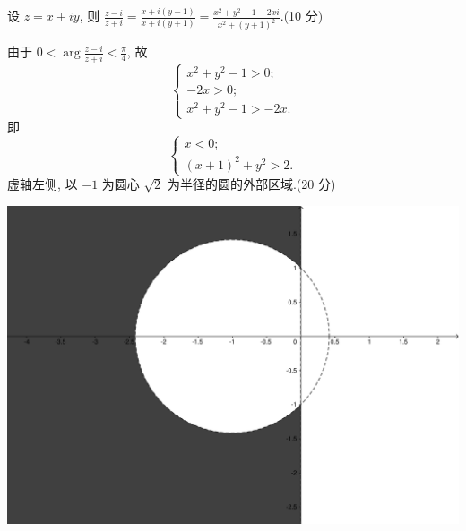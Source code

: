 \documentclass{homework}
\begin{document}
\maketitle

设 \(z=x+iy\), 则 \(\frac{z-i}{z+i}=\frac{x+i(y-1)}{x+i(y+1)}=\frac{x^2+y^2-1-2xi}{x^2+(y+1)^2}\).\hfill (10 分)

由于 \(0<\arg\frac{z-i}{z+i}<\frac{\pi}{4}\), 故
\[\begin{cases}x^2+y^2-1>0;\\-2x>0;\\x^2+y^2-1>-2x.\end{cases}\]
即
\[\begin{cases}x<0;\\(x+1)^2+y^2>2.\end{cases}\]
虚轴左侧, 以 \(-1\) 为圆心 \(\sqrt{2}\) 为半径的圆的外部区域.\hfill (20 分)

\begin{center}
  \includegraphics[width=.72\columnwidth]{figure/1.pdf}
\end{center}


\end{document}
